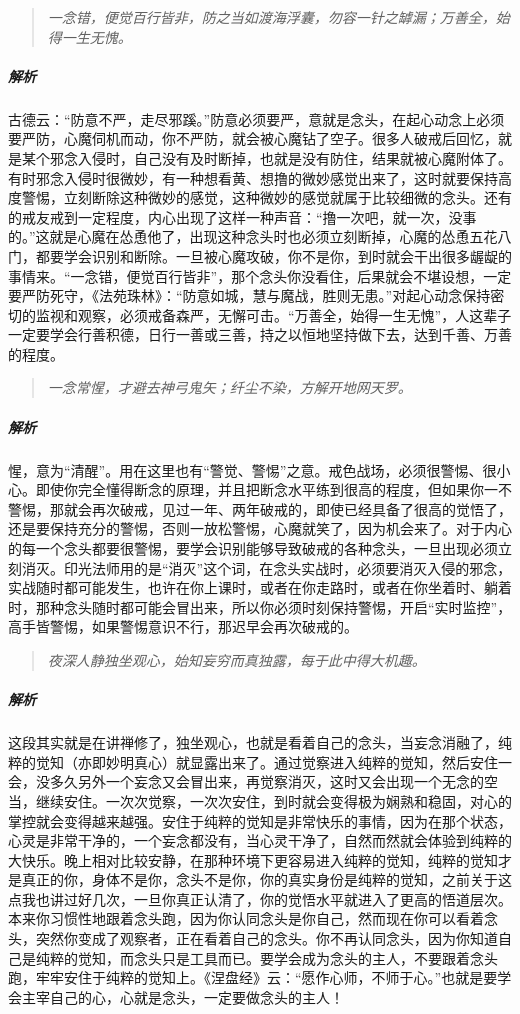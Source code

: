 \begin{quote}\it
    一念错，便觉百行皆非，防之当如渡海浮囊，勿容一针之罅漏；万善全，始得一生无愧。
\end{quote}

\subparagraph{解析} 古德云：“防意不严，走尽邪蹊。”防意必须要严，意就是念头，在起心动念上必须要严防，心魔伺机而动，你不严防，就会被心魔钻了空子。很多人破戒后回忆，就是某个邪念入侵时，自己没有及时断掉，也就是没有防住，结果就被心魔附体了。有时邪念入侵时很微妙，有一种想看黄、想撸的微妙感觉出来了，这时就要保持高度警惕，立刻断除这种微妙的感觉，这种微妙的感觉就属于比较细微的念头。还有的戒友戒到一定程度，内心出现了这样一种声音：“撸一次吧，就一次，没事的。”这就是心魔在怂恿他了，出现这种念头时也必须立刻断掉，心魔的怂恿五花八门，都要学会识别和断除。一旦被心魔攻破，你不是你，到时就会干出很多龌龊的事情来。“一念错，便觉百行皆非”，那个念头你没看住，后果就会不堪设想，一定要严防死守，《法苑珠林》：“防意如城，慧与魔战，胜则无患。”对起心动念保持密切的监视和观察，必须戒备森严，无懈可击。“万善全，始得一生无愧”，人这辈子一定要学会行善积德，日行一善或三善，持之以恒地坚持做下去，达到千善、万善的程度。

\begin{quote}\it
    一念常惺，才避去神弓鬼矢；纤尘不染，方解开地网天罗。
\end{quote}

\subparagraph{解析} 惺，意为“清醒”。用在这里也有“警觉、警惕”之意。戒色战场，必须很警惕、很小心。即使你完全懂得断念的原理，并且把断念水平练到很高的程度，但如果你一不警惕，那就会再次破戒，见过一年、两年破戒的，即使已经具备了很高的觉悟了，还是要保持充分的警惕，否则一放松警惕，心魔就笑了，因为机会来了。对于内心的每一个念头都要很警惕，要学会识别能够导致破戒的各种念头，一旦出现必须立刻消灭。印光法师用的是“消灭”这个词，在念头实战时，必须要消灭入侵的邪念，实战随时都可能发生，也许在你上课时，或者在你走路时，或者在你坐着时、躺着时，那种念头随时都可能会冒出来，所以你必须时刻保持警惕，开启“实时监控”，高手皆警惕，如果警惕意识不行，那迟早会再次破戒的。

\begin{quote}\it
    夜深人静独坐观心，始知妄穷而真独露，每于此中得大机趣。
\end{quote}

\subparagraph{解析} 这段其实就是在讲禅修了，独坐观心，也就是看着自己的念头，当妄念消融了，纯粹的觉知（亦即妙明真心）就显露出来了。通过觉察进入纯粹的觉知，然后安住一会，没多久另外一个妄念又会冒出来，再觉察消灭，这时又会出现一个无念的空当，继续安住。一次次觉察，一次次安住，到时就会变得极为娴熟和稳固，对心的掌控就会变得越来越强。安住于纯粹的觉知是非常快乐的事情，因为在那个状态，心灵是非常干净的，一个妄念都没有，当心灵干净了，自然而然就会体验到纯粹的大快乐。晚上相对比较安静，在那种环境下更容易进入纯粹的觉知，纯粹的觉知才是真正的你，身体不是你，念头不是你，你的真实身份是纯粹的觉知，之前关于这点我也讲过好几次，一旦你真正认清了，你的觉悟水平就进入了更高的悟道层次。本来你习惯性地跟着念头跑，因为你认同念头是你自己，然而现在你可以看着念头，突然你变成了观察者，正在看着自己的念头。你不再认同念头，因为你知道自己是纯粹的觉知，而念头只是工具而已。要学会成为念头的主人，不要跟着念头跑，牢牢安住于纯粹的觉知上。《涅盘经》云：“愿作心师，不师于心。”也就是要学会主宰自己的心，心就是念头，一定要做念头的主人！

